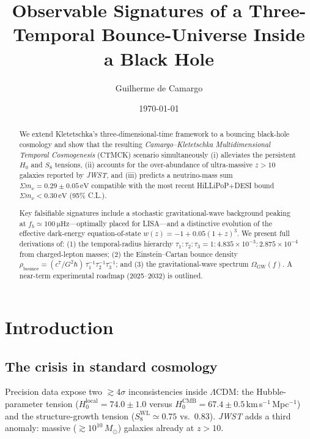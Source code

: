 \documentclass[reprint,aps,prd,amsmath,amssymb,
               nofootinbib,longbibliography]{revtex4-2}
\begin{document}
\title{Observable Signatures of a Three-Temporal Bounce-Universe Inside a Black Hole}

\author{Guilherme de Camargo}
\date{\today}


\begin{abstract}
We extend Kletetschka's three-dimensional-time framework to a bouncing black-hole
cosmology and show that the resulting
\textit{Camargo–Kletetschka Multidimensional Temporal Cosmogenesis} (CTMCK)
scenario simultaneously (i) alleviates the persistent $H_0$ and $S_8$ tensions,
(ii) accounts for the over-abundance of ultra-massive $z>10$ galaxies reported by
\textit{JWST}, and (iii) predicts a neutrino-mass sum
$\Sigma m_\nu = 0.29\pm0.05\,\text{eV}$ compatible with the most recent
HiLLiPoP+DESI bound $\Sigma m_\nu < 0.30\,\text{eV}$ (95\% C.L.).

Key falsifiable signatures include a stochastic gravitational-wave background
peaking at $f_b \simeq \SI{100}{\micro\hertz}$—optimally placed for
\textsc{LISA}—and a distinctive evolution of the effective dark-energy
equation-of-state $w(z) = -1 + 0.05(1+z)^3$.
We present full derivations of:
(1) the temporal-radius hierarchy
$\tau_1\!:\!\tau_2\!:\!\tau_3 = 1\!:\!4.835\times10^{-3}\!:\!2.875\times10^{-4}$
from charged-lepton masses;
(2) the Einstein–Cartan bounce density
$\rho_{\mathrm{bounce}} = (c^7/G^2\hbar)\,\tau_1^{-1}\tau_2^{-1}\tau_3^{-1}$;
and (3) the gravitational-wave spectrum $\Omega_{\mathrm{GW}}(f)$.
A near-term experimental roadmap (2025–2032) is outlined.
\end{abstract}

\maketitle

\section{Introduction}\label{sec:intro}

\subsection{The crisis in standard cosmology}
Precision data expose two $\gtrsim\!4\sigma$ inconsistencies inside
$\Lambda$CDM: the Hubble-parameter tension
($H_0^{\mathrm{local}} = 74.0\pm1.0$ versus
$H_0^{\mathrm{CMB}} = 67.4\pm0.5$\,km\,s$^{-1}$\,Mpc$^{-1}$) and the structure-growth
tension ($S_8^{\mathrm{WL}}\!\simeq\!0.75$ vs.\ $0.83$).
\textit{JWST} adds a third anomaly: massive
($\gtrsim10^{10}\,M_\odot$) galaxies already at $z>10$.
\end{document}
